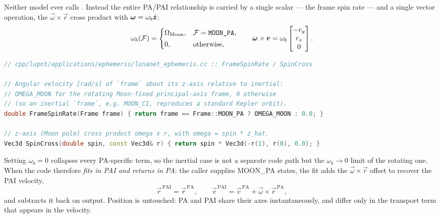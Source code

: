 Neither model ever calls . Instead the entire PA/PAI
relationship is carried by a single scalar --- the frame spin rate --- and a
single vector operation, the $\vec{\omega}\times\vec{r}$ cross product with
$\bm{\omega} = \omega_b\hat{\bm{z}}$:
\begin{equation}
  \label{eq:eph-spin}
  \omega_b(\mathcal{F}) =
  \begin{cases}
    \Omega_\mathrm{Moon}, & \mathcal{F} = \texttt{MOON\_PA},\\[2pt]
    0, & \text{otherwise},
  \end{cases}
  \qquad
  \bm{\omega}\times\bm{r} = \omega_b
  \begin{bmatrix} -r_y \\ r_x \\ 0 \end{bmatrix}.
\end{equation}

\begin{lstlisting}[language=cpp, caption={Frame spin rate and the $z$-axis cross product, \code{cpp/lupnt/applications/ephemeris/lunanet\_ephemeris.cc}. The same two helpers are repeated verbatim in \code{lunanet\_almanac.cc}.}, label={lst:eph-spin}]
// cpp/lupnt/applications/ephemeris/lunanet_ephemeris.cc :: FrameSpinRate / SpinCross

// Angular velocity [rad/s] of `frame` about its z-axis relative to inertial:
// OMEGA_MOON for the rotating Moon-fixed principal-axis frame, 0 otherwise
// (so an inertial `frame`, e.g. MOON_CI, reproduces a standard Kepler orbit).
double FrameSpinRate(Frame frame) { return frame == Frame::MOON_PA ? OMEGA_MOON : 0.0; }

// z-axis (Moon pole) cross product omega x r, with omega = spin * z_hat.
Vec3d SpinCross(double spin, const Vec3d& r) { return spin * Vec3d(-r(1), r(0), 0.0); }
\end{lstlisting}

Setting $\omega_b = 0$ collapses every PA-specific term, so the inertial case
is not a separate code path but the $\omega_b \to 0$ limit of the rotating
one. When  the code therefore
\emph{fits in PAI and returns in PA}: the caller supplies MOON\_PA states, the
fit adds the $\vec{\omega}\times\vec{r}$ offset to recover the PAI velocity,
\begin{equation}
  \label{eq:eph-pai-velocity}
  \vec{r}^{\,\mathrm{PAI}} = \vec{r}^{\,\mathrm{PA}},
  \qquad
  \vec{v}^{\,\mathrm{PAI}} = \vec{v}^{\,\mathrm{PA}} + \vec{\omega}\times\vec{r}^{\,\mathrm{PA}},
\end{equation}
and  subtracts it back on output. Position is untouched: PA and PAI
share their axes instantaneously, and differ only in the transport term that
appears in the velocity.

